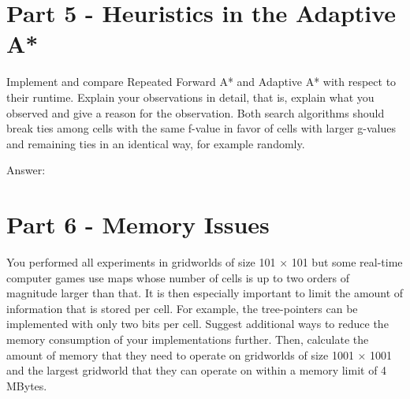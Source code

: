 \documentclass{article}
\begin{document}

\section{Part 5 - Heuristics in the Adaptive A*}

Implement and compare Repeated Forward A* and Adaptive A*
with respect to their runtime. Explain your observations in detail, that is, explain what you observed and give a reason for
the observation. Both search algorithms should break ties among cells with the same f-value in favor of cells with larger
g-values and remaining ties in an identical way, for example randomly.
\newline


Answer: \newline

\par 


\section{Part 6 - Memory Issues}

You performed all experiments in gridworlds of size 101 × 101 but some real-time
computer games use maps whose number of cells is up to two orders of magnitude larger than that. It is then especially
important to limit the amount of information that is stored per cell. For example, the tree-pointers can be implemented with
only two bits per cell. Suggest additional ways to reduce the memory consumption of your implementations further. Then,
calculate the amount of memory that they need to operate on gridworlds of size 1001 × 1001 and the largest gridworld that
they can operate on within a memory limit of 4 MBytes.
\newline

\end{document}
